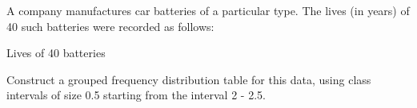 A company manufactures car batteries of a particular type. The lives (in years) of 40 such batteries were recorded as follows:\\
\begin{table}[ht!]
\centering

\caption{Lives of 40 batteries}
\label{table:input_36}
\end{table}
Construct a grouped frequency distribution table for this data, using class intervals of size 0.5 starting from the interval 2 - 2.5.\\
